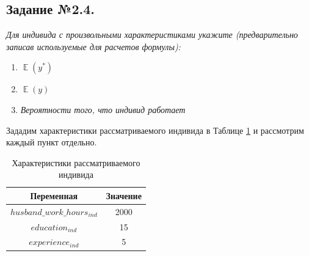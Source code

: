 \documentclass[a4paper,12pt]{article}
\DeclareMathOperator{\EX}{\mathbb{E}}%
\begin{document}
\subsection{Задание №2.4.}
\textit{Для индивида с произвольными характеристиками укажите (предварительно
записав используемые для расчетов формулы):}

\begin{enumerate}[label=\Alph*)]
	\item $\EX(y^*)$
	\item $\EX(y)$
	\item \textit{Вероятности того, что индивид работает}
\end{enumerate}

\vspace{0.2cm}

Зададим характеристики рассматриваемого индивида в Таблице \ref{individ} и рассмотрим каждый пункт отдельно.


\begin{table}[!h]
	\caption{Характеристики рассматриваемого индивида}
	\label{individ}
	\centering
	\small
	\begin{tabular}{|c|c|}
		\hline
		Переменная &  Значение  \\ 
		\hline
		$husband\_work\_hours_{ind} $ &2000 \\ 
		\hline
		$education_{ind} $ &15 \\ 		
		\hline
		$experience_{ind} $ &5 \\ 	
		\hline
	\end{tabular}
\end{table}
\end{document}

